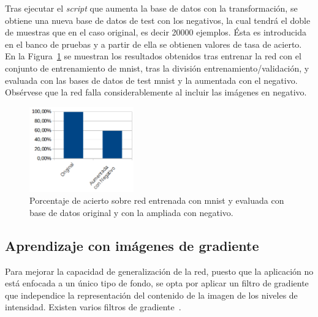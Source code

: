 Tras ejecutar el \textit{script} que aumenta la base de datos con la transformación, se obtiene una nueva base de datos de test con los negativos, la cual tendrá el doble de muestras que en el caso original, es decir 20000 ejemplos. Ésta es introducida en el banco de pruebas y a partir de ella se obtienen valores de tasa de acierto.\\

En la Figura~\ref{fig.neg-orig} se muestran los resultados obtenidos tras entrenar la red con el conjunto de entrenamiento  de \acrshort{mnist}, tras la división entrenamiento/validación, y evaluada con las bases de datos de test \acrshort{mnist} y la aumentada con el negativo. Obsérvese que la red falla considerablemente al incluir las imágenes en negativo.

\begin{figure}[H]
	\begin{center}
		\includegraphics[width=0.4\textwidth]{figures/orig_neg}
		\caption{Porcentaje de acierto sobre red entrenada con \acrshort{mnist} y evaluada con base de datos original y con la ampliada con negativo.}
		\label{fig.neg-orig}
	\end{center}
\end{figure}

\subsection{Aprendizaje con imágenes de gradiente}
\label{sec.bordes}
Para mejorar la capacidad de generalización de la red, puesto que la aplicación no está enfocada a un único tipo de fondo, se opta por aplicar un filtro de gradiente que independice la representación del contenido de la imagen de los niveles de intensidad. Existen varios filtros de gradiente~\cite{fundamentos}.\\

